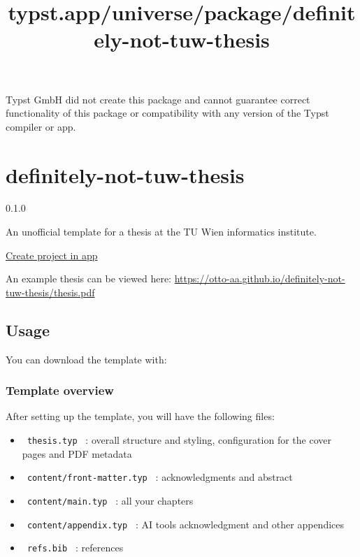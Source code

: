Typst GmbH did not create this package and cannot guarantee correct
functionality of this package or compatibility with any version of the
Typst compiler or app.


\title{typst.app/universe/package/definitely-not-tuw-thesis}

\label{banner}
\label{template-thumbnail}

\section{definitely-not-tuw-thesis}\label{definitely-not-tuw-thesis}

{ 0.1.0 }

An unofficial template for a thesis at the TU Wien informatics
institute.

\href{/app?template=definitely-not-tuw-thesis&version=0.1.0}{Create
project in app}

\label{readme}
An example thesis can be viewed here:
\url{https://otto-aa.github.io/definitely-not-tuw-thesis/thesis.pdf}

\subsection{Usage}\label{usage}

You can download the template with:

\begin{Shaded}
\begin{Highlighting}[]
\end{Highlighting}
\end{Shaded}

\subsubsection{Template overview}\label{template-overview}

After setting up the template, you will have the following files:

\begin{itemize}
\tightlist
\item
  \texttt{\ thesis.typ\ } : overall structure and styling, configuration
  for the cover pages and PDF metadata
\item
  \texttt{\ content/front-matter.typ\ } : acknowledgments and abstract
\item
  \texttt{\ content/main.typ\ } : all your chapters
\item
  \texttt{\ content/appendix.typ\ } : AI tools acknowledgment and other
  appendices
\item
  \texttt{\ refs.bib\ } : references
\end{itemize}


